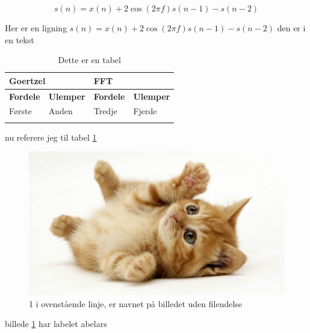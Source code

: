 \documentclass[a4paper,11pt,danish,oneside]{article}
\begin{document}
\begin{equation}
	s(n)=x(n)+2 \cos(2 \pi f) s(n-1)-s(n-2)
\end{equation}

Her er en ligning $s(n)=x(n)+2 \cos(2 \pi f) s(n-1)-s(n-2)$ den er i en tekst

\begin{table}[h]
	\begin{tabularx}{\textwidth}{|X|X|X|X|}
		\hline
		\multicolumn{2}{|l|}{\textbf{Goertzel}} & \multicolumn{2}{l|}{\textbf{FFT}} \\ \hline
	\textbf{Fordele} & \textbf{Ulemper} & \textbf{Fordele} & \textbf{Ulemper} \\ \hline
	Første & Anden & Tredje & Fjerde \\ \hline
	& & & \\ \hline
	\end{tabularx}
	\caption{Dette er en tabel}
	\label{tabel1}
\end{table}

nu referere jeg til tabel \ref{tabel1}

\begin{figure}[h]
	\centering
	\includegraphics[scale=0.2]{1}
	\caption{1 i ovenstående linje, er navnet på billedet uden filendelse}
	\label{abelars}
\end{figure}

billede \ref{abelars} har labelet abelars
\end{document}
